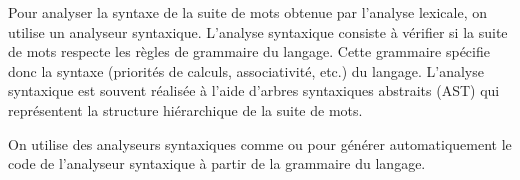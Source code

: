 Pour analyser la syntaxe de la suite de mots obtenue par l'analyse lexicale, on utilise un analyseur syntaxique. L'analyse syntaxique consiste à vérifier si la suite de mots respecte les règles de grammaire du langage. Cette grammaire spécifie donc la syntaxe (priorités de calculs, associativité, etc.) du langage. L'analyse syntaxique est souvent réalisée à l'aide d'arbres syntaxiques abstraits (AST) qui représentent la structure hiérarchique de la suite de mots.\\\par

On utilise des analyseurs syntaxiques comme  ou  pour générer automatiquement le code de l'analyseur syntaxique à partir de la grammaire du langage. 
